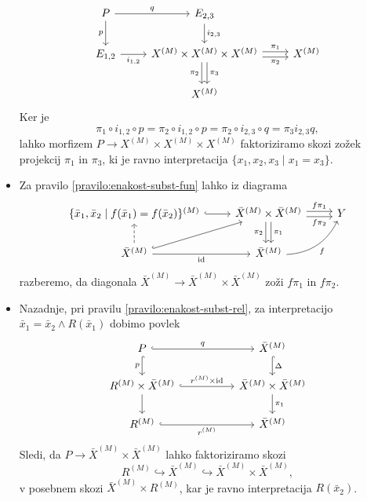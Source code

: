 \documentclass[../kategoricna_logika.tex]{subfiles}
\begin{document}
\begin{dokaz}
\begin{itemize}
\begin{equation*}
\begin{tikzcd}
        P \ar[d, "p"'] \ar[r, "q"] & E_{2,3} \ar[d, "i_{2,3}"] \\
        E_{1,2} \ar[r, "i_{1,2}"'] & X^{(M)} \times X^{(M)} \times
        X^{(M)} \ar[d, shift left, "\pi_3"] \ar[d, shift right,
        "\pi_2"'] \ar[r, shift left, "\pi_1"]
        \ar[r, shift right, "\pi_2"'] & X^{(M)} \\
        & X^{(M)}
      \end{tikzcd}
    \end{equation*}
    Ker je
    \[ \pi_1 \circ i_{1,2} \circ p = \pi_2 \circ i_{1,2} \circ p =
      \pi_2 \circ i_{2,3} \circ q = \pi_3i_{2,3}q,\]
    lahko morfizem
    $P \to X^{(M)} \times X^{(M)} \times X^{(M)}$ faktoriziramo skozi
    zožek projekcij $\pi_1$ in $\pi_3$, ki je ravno interpretacija
    $\{x_1, x_2, x_3 \mid x_1 = x_3\}$.
  \item Za pravilo \ref{pravilo:enakost-subst-fun} lahko iz diagrama
    \begin{equation*}
      \begin{tikzcd}
        \{\bar{x}_1, \bar{x}_2 \mid f(\bar{x}_1) =
        f(\bar{x}_2)\}^{(M)} \ar[r, hook] & \bar{X}^{(M)} \times
        \bar{X}^{(M)} \ar[r, shift left, "f \pi_1"] \ar[r, shift
        right, "f \pi_2"']
        \ar[d, shift left, "\pi_1"] \ar[d, shift right, "\pi_2"'] & Y \\
        \bar{X}^{(M)} \ar[u, dashed] \ar[ur, hook] \ar[r, "
        \mathrm{id}"'] & \bar{X}^{(M)} \ar[ur, bend right, "f"']
      \end{tikzcd}
    \end{equation*}
    razberemo, da diagonala
    $\bar{X}^{(M)} \to \bar{X}^{(M)} \times \bar{X}^{(M)}$ zoži
    $f \pi_1$ in $f \pi_2$.
  \item Nazadnje, pri pravilu \ref{pravilo:enakost-subst-rel}, za
    interpretacijo $\bar{x}_1 = \bar{x}_2 \land R(\bar{x}_1)$ dobimo povlek
    \begin{equation*}
      \begin{tikzcd}[column sep=5em]
        P \ar[d, hook, "p"'] \ar[r, hook, "q"] & \bar{X}^{(M)} \ar[d, hook, "\Delta"] \\
        R^{(M)} \times \bar{X}^{(M)} \ar[d] \ar[r, hook, "r^{(M)}
        \times \mathrm{id}"] &
        \bar{X}^{(M)} \times \bar{X}^{(M)} \ar[d, "\pi_1"] \\
        R^{(M)} \ar[r, hook, "r^{(M)}"'] & \bar{X}^{(M)}
      \end{tikzcd}
    \end{equation*}
    Sledi, da $P \to \bar{X}^{(M)} \times \bar{X}^{(M)}$ lahko
    faktoriziramo skozi
    \[R^{(M)} \hookrightarrow \bar{X}^{(M)} \hookrightarrow
      \bar{X}^{(M)} \times \bar{X}^{(M)},\] v posebnem skozi
    $\bar{X}^{(M)} \times R^{(M)}$, kar je ravno interpretacija
    $R(\bar{x}_2)$.\qedhere
  \end{itemize}
\end{dokaz}
%
\end{document}
